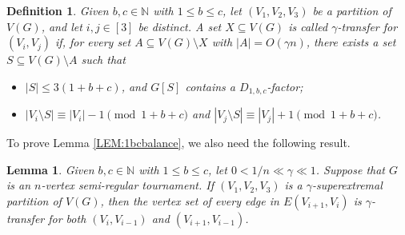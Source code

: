 \documentclass[11pt,a4paper,reqno]{amsart}
\newtheorem{definition}{Definition}
\newtheorem{lemma}[theorem]{Lemma}
\theoremstyle{definition} %
\begin{document}
\begin{definition}\label{DEF:robust}
Given $b,c\in\mathbb{N}$ with $1\leqslant b\leqslant c$, let $(V_1,V_2,V_3)$ be a partition of $V(G)$, and let $i,j\in[3]$ be distinct. 
A set $X\subseteq V(G)$ is called  \emph{$\gamma$-transfer for $(V_i,V_j)$} if, for every set $A\subseteq V(G)\setminus X$ with $|A|=O( \gamma n)$, there exists a set $S\subseteq V(G)\setminus A$ such that
\begin{itemize}
\item $|S|\leqslant 3(1+b+c)$, and $G[S]$ contains a $D_{1,b,c}$-factor;
\item $|V_i\setminus S| \equiv |V_i|-1 \pmod{1+b+c}$ and $|V_j\setminus S| \equiv |V_j|+1 \pmod{1+b+c}$.
\end{itemize}
\end{definition}



To prove Lemma \ref{LEM:1bcbalance}, we also need the following result. 

\begin{lemma}\label{LEM-edgegood}
    Given $b,c\in\mathbb{N}$ with $1\leqslant b\leqslant c$, let $0<1/n\ll\gamma\ll 1$. Suppose that $G$ is an $n$-vertex semi-regular tournament. If $(V_1,V_2,V_3)$ is a $\gamma$-superextremal partition of $V(G)$, then the vertex set of every edge in $E(V_{i+1},V_i)$ is $\gamma$-transfer for both $(V_i,V_{i-1})$ and $(V_{i+1},V_{i-1})$.
\end{lemma}
\end{document}
